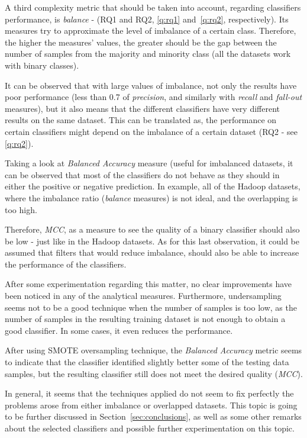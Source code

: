 A third complexity metric that should be taken into account, regarding 
classifiers performance, is \textit{balance} - (RQ1 and RQ2, \ref{q:rq1} 
and~\ref{q:rq2}, respectively). Its measures try to approximate the level of 
imbalance of a certain class. Therefore, the higher the measures' values, the 
greater should be the gap between the number of samples from the majority and 
minority class (all the datasets work with binary classes).

It can be observed that with large values of imbalance, not only the results 
have poor performance (less than 0.7 of \textit{precision}, and similarly with 
\textit{recall} and \textit{fall-out} measures), but it also means that the 
different classifiers have very different results on the same dataset. This can 
be translated as, the performance on certain classifiers might depend on the 
imbalance of a certain dataset (RQ2 - see \ref{q:rq2}).

Taking a look at \textit{Balanced Accuracy} measure (useful for imbalanced 
datasets, it can be observed that most of the classifiers do not behave as 
they should in either the positive or negative prediction. In example, all of 
the Hadoop datasets, where the imbalance ratio (\textit{balance} measures) is 
not ideal, and the overlapping is too high. 

Therefore, \textit{MCC}, as a measure to see the quality of a binary classifier 
should also be low - just like in the Hadoop datasets. As for this last 
observation, it could be assumed that filters that would reduce imbalance, 
should also be able to increase the performance of the classifiers.

After some experimentation regarding this matter, no clear improvements have 
been noticed in any of the analytical measures. Furthermore, undersampling 
seems not to be a good technique when the number of samples is too low, as the 
number of samples in the resulting training dataset is not enough to obtain a 
good classifier. In some cases, it even reduces the performance.

After using SMOTE oversampling technique, the \textit{Balanced Accuracy} metric 
seems to indicate that the classifier identified slightly better some of the 
testing data samples, but the resulting classifier still does not meet the 
desired quality (\textit{MCC}).

In general, it seems that the techniques applied do not seem to fix perfectly 
the problems arose from either imbalance or overlapped datasets. This topic is 
going to be further discussed in Section~\ref{sec:conclusions}, as well as some 
other remarks about the selected classifiers and possible further 
experimentation on this topic.

